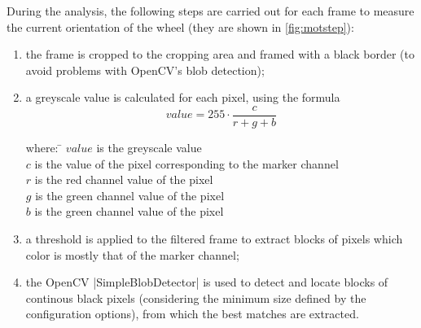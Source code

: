 \beforelist* During the analysis, the following steps are carried out for each
frame to measure the current orientation of the wheel (they are shown in
\autoref{fig:motstep}):
\begin{enumerate}[label=\alph*)]
  \item the frame is cropped to the cropping area and framed with a black border
    (to avoid problems with OpenCV's blob detection);
  \item a greyscale value is calculated for each pixel, using the formula
    \[
      value = 255\cdot\frac{c}{r + g + b}
    \]
    \begin{tabbing}
      where:  \= $value$ is the greyscale value \\
              \> $c$ is the value of the pixel corresponding to the marker
                channel \\
              \> $r$ is the red channel value of the pixel \\
              \> $g$ is the green channel value of the pixel \\
              \> $b$ is the green channel value of the pixel
    \end{tabbing}
  \item a threshold is applied to the filtered frame to extract blocks of pixels
    which color is mostly that of the marker channel;
  \item the OpenCV \Code|SimpleBlobDetector| is used to detect and locate blocks
    of continous black pixels (considering the minimum size defined by the
    configuration options), from which the best matches are extracted.
\end{enumerate}
\afterlist*

